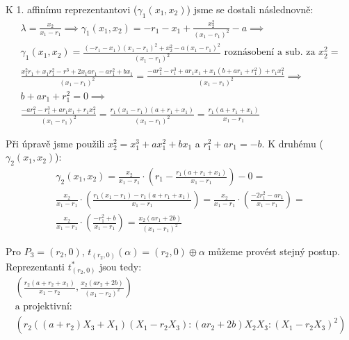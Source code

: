 \documentclass[12pt, a4paper]{article}
\begin{document}
K 1. affinímu reprezentantovi ($\gamma_1(x_1,x_2)$) jsme se dostali následnovně:
\begin{gather*}
\lambda = \frac{x_2}{x_1-r_1} \implies \gamma_1(x_1,x_2) = - r_1 - x_1 + \frac{x_2^2}{(x_1-r_1)^2} - a \implies\\
\gamma_1(x_1,x_2) = \frac{(-r_1-x_1)(x_1-r_1)^2+x_2^2-a(x_1-r_1)^2}{(x_1-r_1)^2} \text{ roznásobení a sub. za $x_2^2$} =\\
\frac{x_1^2r_1+x_1r_1^2-r^3+2x_1ar_1-ar_1^2+bx_1}{(x_1-r_1)^2} = \frac{-ar_1^2-r_1^3+ar_1x_1+x_1(b+ar_1+r_1^2)+r_1x_1^2}{(x_1-r_1)^2} \implies\\
b+ar_1+r_1^2 = 0 \implies\\
\frac{-ar_1^2-r_1^3+ar_1x_1+r_1x_1^2}{(x_1-r_1)^2} = \frac{r_1(x_1-r_1)(a+r_1+x_1)}{(x_1-r_1)^2} = \frac{r_1(a+r_1+x_1)}{x_1-r_1}
\end{gather*}

Při úpravě jsme použili $x_2^2 = x_1^3+ax_1^2+bx_1$ a $r_1^2+ar_1 = -b$. K druhému ($\gamma_2(x_1,x_2)$):
\begin{gather*}
\gamma_2(x_1,x_2) = \frac{x_2}{x_1-r_1} \cdot \left( r_1 - \frac{r_1(a+r_1+x_1)}{x_1-r_1} \right) - 0 =\\
\frac{x_2}{x_1-r_1} \cdot \left(\frac{r_1(x_1-r_1) - r_1(a+r_1+x_1)}{x_1-r_1} \right) = \frac{x_2}{x_1-r_1} \cdot \left(\frac{-2r_1^2-ar_1}{x_1-r_1} \right) = \\
 \frac{x_2}{x_1-r_1} \cdot \left(\frac{-r_1^2+b}{x_1-r_1} \right) =  \frac{x_2(ar_1+2b)}{(x_1-r_1)^2}
\end{gather*}

Pro $P_3 = (r_2,0)$, $t_{(r_2,0)}(\alpha) = (r_2, 0) \oplus \alpha$ můžeme provést stejný postup. Reprezentanti $t_{(r_2,0)}^*$ jsou tedy:
\begin{gather*}
\left(\frac{r_2(a+r_2+x_1)}{x_1-r_2}, \frac{x_2(ar_2+2b)}{(x_1-r_2)^2} \right )\\
\text{a projektivní:}\\
\left(r_2((a+r_2)X_3 + X_1)(X_1-r_2X_3) : (ar_2+2b)X_2X_3 : (X_1-r_2X_3)^2 \right)
\end{gather*}
\end{document}
